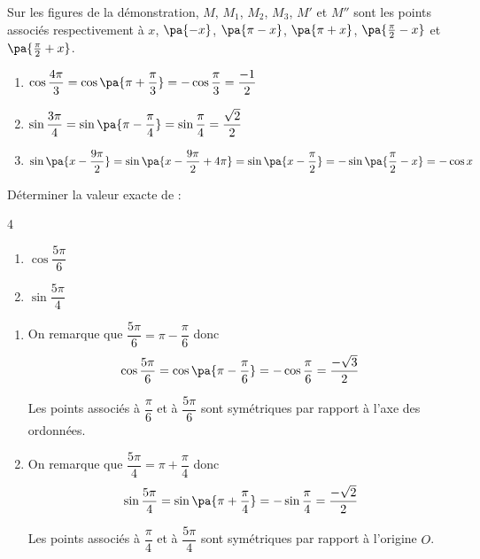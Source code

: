 \begin{rem}
	Sur les figures de la démonstration, $M$, $M_1$, $M_2$, $M_3$, $M'$ et $M''$ sont les points associés respectivement à $x$, $\pa{-x}$, $\pa{\pi - x}$, $\pa{\pi + x}$, $\pa{\frac{\pi}{2} - x}$ et $\pa{\frac{\pi}{2} + x}$.
\end{rem}

\begin{ex}
	\nline
	\begin{enumerate}
		\item $\cos\dfrac{4\pi}{3} = \cos\pa{\pi + \dfrac{\pi}{3}} = -\cos\dfrac{\pi}{3} = \dfrac{-1}{2}$
		\item $\sin\dfrac{3\pi}{4} = \sin\pa{\pi - \dfrac{\pi}{4}} = \sin\dfrac{\pi}{4} = \dfrac{\sqrt{2}}{2}$
		\item $\sin\pa{x - \dfrac{9\pi}{2}} = \sin\pa{x - \dfrac{9\pi}{2} + 4\pi} = \sin\pa{x - \dfrac{\pi}{2}} = -\sin\pa{\dfrac{\pi}{2} - x} = -\cos x$
	\end{enumerate}
\end{ex}

\begin{methode}
	Déterminer la valeur exacte de :

	\begin{multicols}{4}
		\begin{enumerate}
			\item $\cos\dfrac{5\pi}{6}$
			\item $\sin\dfrac{5\pi}{4}$
		\end{enumerate}
	\end{multicols}

	\begin{correction}
		\nline
		\begin{enumerate}
			\item On remarque que $\dfrac{5\pi}{6} = \pi - \dfrac{\pi}{6}$ donc
			      \[
				      \cos\dfrac{5\pi}{6} = \cos\pa{\pi - \dfrac{\pi}{6}} = -\cos\dfrac{\pi}{6} = \dfrac{-\sqrt{3}}{2}
			      \]

			      Les points associés à $\dfrac{\pi}{6}$ et à $\dfrac{5\pi}{6}$ sont symétriques par rapport à l'axe des ordonnées.

			\item On remarque que $\dfrac{5\pi}{4} = \pi + \dfrac{\pi}{4}$ donc
			      \[
				      \sin\dfrac{5\pi}{4} = \sin\pa{\pi + \dfrac{\pi}{4}} = -\sin\dfrac{\pi}{4} = \dfrac{-\sqrt{2}}{2}
			      \]

			      Les points associés à $\dfrac{\pi}{4}$ et à $\dfrac{5\pi}{4}$ sont symétriques par rapport à l'origine $O$.
		\end{enumerate}
	\end{correction}
\end{methode}

